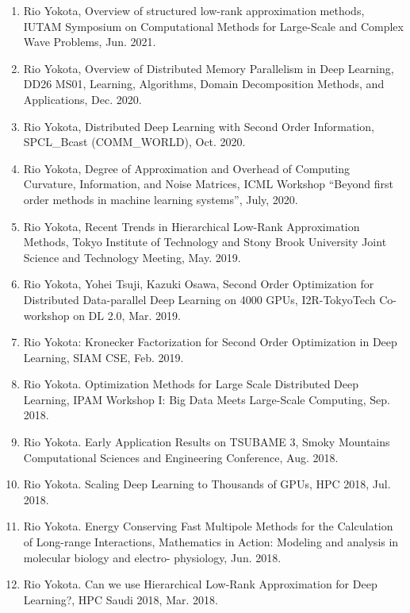 \documentclass[margin,line]{cv}
\begin{document}
\begin{resume}
\begin{enumerate}
\item Rio Yokota, Overview of structured low-rank approximation methods, IUTAM Symposium on Computational Methods for Large-Scale and Complex Wave Problems, Jun. 2021.

\item Rio Yokota, Overview of Distributed Memory Parallelism in Deep Learning, DD26 MS01, Learning, Algorithms, Domain Decomposition Methods, and Applications, Dec. 2020.

\item Rio Yokota, Distributed Deep Learning with Second Order Information, SPCL\_Bcast (COMM\_WORLD), Oct. 2020.

\item Rio Yokota, Degree of Approximation and Overhead of Computing Curvature, Information, and Noise Matrices, ICML Workshop “Beyond first order methods in machine learning systems”, July, 2020.

\item Rio Yokota, Recent Trends in Hierarchical Low-Rank Approximation Methods, Tokyo Institute of Technology and Stony Brook University Joint Science and Technology Meeting, May. 2019.

\item Rio Yokota, Yohei Tsuji, Kazuki Osawa, Second Order Optimization for Distributed Data-parallel Deep Learning on 4000 GPUs, I2R-TokyoTech Co-workshop on DL 2.0, Mar. 2019.

\item Rio Yokota: Kronecker Factorization for Second Order Optimization in Deep Learning, SIAM CSE, Feb. 2019.

\item Rio Yokota. Optimization Methods for Large Scale Distributed Deep Learning, IPAM Workshop I: Big Data Meets Large-Scale Computing, Sep. 2018.

\item Rio Yokota. Early Application Results on TSUBAME 3, Smoky Mountains Computational Sciences and Engineering Conference, Aug. 2018.

\item Rio Yokota. Scaling Deep Learning to Thousands of GPUs, HPC 2018, Jul. 2018.

\item Rio Yokota. Energy Conserving Fast Multipole Methods for the Calculation of Long-range Interactions, Mathematics in Action: Modeling and analysis in molecular biology and electro- physiology, Jun. 2018.

\item Rio Yokota. Can we use Hierarchical Low-Rank Approximation for Deep Learning?, HPC Saudi 2018, Mar. 2018.


\end{enumerate}
\end{resume}
\end{document}
